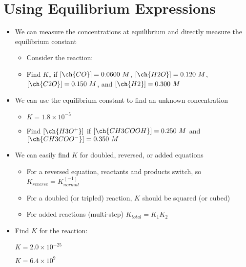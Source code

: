 \documentclass[12pt, openany, letterpaper]{memoir}
\begin{document}
\section{Using Equilibrium Expressions}
\begin{itemize}
	\item We can measure the concentrations at equilibrium and directly measure the equilibrium constant
	\begin{itemize}
		\item Consider the reaction: 
		\item Find $K_c$ if $\left[\ch{CO}\right]=0.0600~M$, $\left[\ch{H2O}\right]=0.120~M$, $\left[\ch{C2O}\right]=0.150~M$, and $\left[\ch{H2}\right]=0.300~M$
	\end{itemize}
	\item We can use the equilibrium constant to find an unknown concentration
	\begin{itemize}
		\item {} \hspace{1em} $K=1.8\times10^{-5}$
		\item Find $\left[\ch{H3O^+}\right]$ if $\left[\ch{CH3COOH}\right] = 0.250~M$ and $\left[\ch{CH3COO^-}\right]=0.350~M$
	\end{itemize}
	\item We can easily find $K$ for doubled, reversed, or added equations
	\begin{itemize}
		\item For a reversed equation, reactants and products switch, so $K_{reverse} = K_{normal}^(-1)$
		\item For a doubled (or tripled) reaction, $K$ should be squared (or cubed)
		\item For added reactions (multi-step) $K_{total}=K_1K_2$
	\end{itemize}
	\item Find $K$ for the reaction: 
	
	 \hspace{1em} $K=2.0\times10^{-25}$
	
	 \hspace{1em} $K=6.4\times10^{9}$
\end{itemize}
\end{document}
